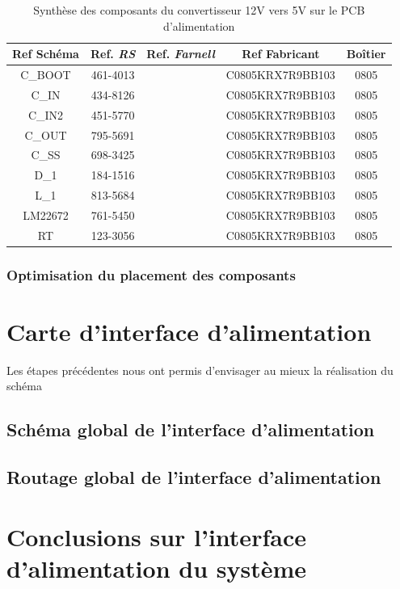 				\begin{table}
					\begin{center}
						\begin{tabular}{|c|c|c|c|c|}
						\hline
						\textbf{Ref Schéma} & Ref. \textit{RS} & Ref. \textit{Farnell} & Ref Fabricant & Boîtier \\ 
						\hline
						C\_BOOT & 461-4013 & & C0805KRX7R9BB103 & 0805 \\
						\hline
						C\_IN & 434-8126 & & C0805KRX7R9BB103 & 0805 \\
						\hline
						C\_IN2 & 451-5770 & & C0805KRX7R9BB103 & 0805 \\
						\hline
						C\_OUT & 795-5691 & & C0805KRX7R9BB103 & 0805 \\
						\hline
						C\_SS & 698-3425 & & C0805KRX7R9BB103 & 0805 \\
						\hline
						D\_1 & 184-1516 & & C0805KRX7R9BB103 & 0805 \\
						\hline
						L\_1 & 813-5684 & & C0805KRX7R9BB103 & 0805 \\
						\hline
						LM22672 & 761-5450 & & C0805KRX7R9BB103 & 0805 \\
						\hline
						RT & 123-3056 & & C0805KRX7R9BB103 & 0805 \\
						\hline
						\end{tabular}
					\end{center}
					\caption{Synthèse des composants du convertisseur 12V vers 5V sur le PCB d'alimentation}
					\label{synth_composants}
				\end{table}
				
				\subsubsection{Optimisation du placement des composants}
				
	\section{Carte d'interface d'alimentation}
	
	Les étapes précédentes nous ont permis d'envisager au mieux la 
	réalisation du schéma
	
		\subsection{Schéma global de l'interface d'alimentation}
		
		
		\subsection{Routage global de l'interface d'alimentation}
		
	\section{Conclusions sur l'interface d'alimentation du système}
